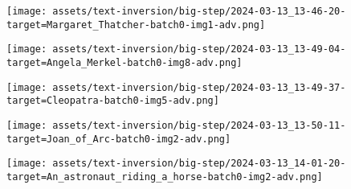 \begin{figure*}[]
\vspace{1ex}
\begin{minipage}[t]{.025\textwidth}
     \vspace{0pt}
\end{minipage}%
\hspace{1ex}
\begin{minipage}[t]{0.98\textwidth}
    \vspace{0pt}
    \begin{subfigure}[t]{0.2\textwidth}
        \texttt{[image: assets/text-inversion/big-step/2024-03-13\_13-46-20-target=Margaret\_Thatcher-batch0-img1-adv.png]}
    \end{subfigure}%
    \begin{subfigure}[t]{0.2\textwidth}
        \texttt{[image: assets/text-inversion/big-step/2024-03-13\_13-49-04-target=Angela\_Merkel-batch0-img8-adv.png]}
    \end{subfigure}%
    \begin{subfigure}[t]{0.2\textwidth}
        \texttt{[image: assets/text-inversion/big-step/2024-03-13\_13-49-37-target=Cleopatra-batch0-img5-adv.png]}
    \end{subfigure}%
    \begin{subfigure}[t]{0.2\textwidth}
        \texttt{[image: assets/text-inversion/big-step/2024-03-13\_13-50-11-target=Joan\_of\_Arc-batch0-img2-adv.png]}
    \end{subfigure}%
    \begin{subfigure}[t]{0.2\textwidth}
        \texttt{[image: assets/text-inversion/big-step/2024-03-13\_14-01-20-target=An\_astronaut\_riding\_a\_horse-batch0-img2-adv.png]}
    \end{subfigure}%
\end{minipage}



\end{figure*}
